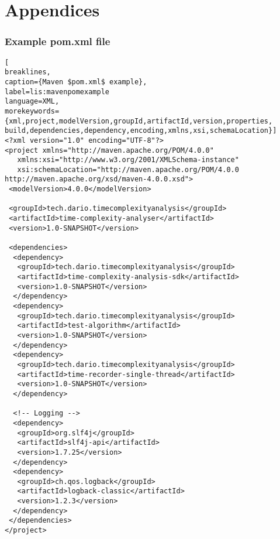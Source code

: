 \chapter{Appendices}

\subsection{Example pom.xml file}
\label{sec:appendices:examplepomfile}

\begin{lstlisting}[
breaklines,
caption={Maven $pom.xml$ example},
label=lis:mavenpomexample
language=XML,
morekeywords={xml,project,modelVersion,groupId,artifactId,version,properties,
build,dependencies,dependency,encoding,xmlns,xsi,schemaLocation}]
<?xml version="1.0" encoding="UTF-8"?>
<project xmlns="http://maven.apache.org/POM/4.0.0"
   xmlns:xsi="http://www.w3.org/2001/XMLSchema-instance"
   xsi:schemaLocation="http://maven.apache.org/POM/4.0.0 http://maven.apache.org/xsd/maven-4.0.0.xsd">
 <modelVersion>4.0.0</modelVersion>

 <groupId>tech.dario.timecomplexityanalysis</groupId>
 <artifactId>time-complexity-analyser</artifactId>
 <version>1.0-SNAPSHOT</version>

 <dependencies>
  <dependency>
   <groupId>tech.dario.timecomplexityanalysis</groupId>
   <artifactId>time-complexity-analysis-sdk</artifactId>
   <version>1.0-SNAPSHOT</version>
  </dependency>
  <dependency>
   <groupId>tech.dario.timecomplexityanalysis</groupId>
   <artifactId>test-algorithm</artifactId>
   <version>1.0-SNAPSHOT</version>
  </dependency>
  <dependency>
   <groupId>tech.dario.timecomplexityanalysis</groupId>
   <artifactId>time-recorder-single-thread</artifactId>
   <version>1.0-SNAPSHOT</version>
  </dependency>

  <!-- Logging -->
  <dependency>
   <groupId>org.slf4j</groupId>
   <artifactId>slf4j-api</artifactId>
   <version>1.7.25</version>
  </dependency>
  <dependency>
   <groupId>ch.qos.logback</groupId>
   <artifactId>logback-classic</artifactId>
   <version>1.2.3</version>
  </dependency>
 </dependencies>
</project>
\end{lstlisting}